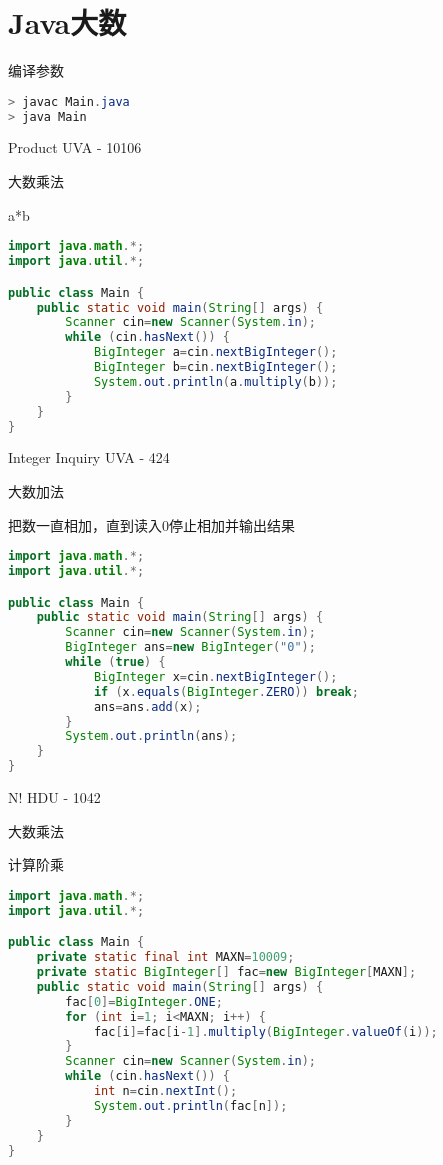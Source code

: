 \section{Java大数}

编译参数

\begin{lstlisting}[language={java}]
> javac Main.java
> java Main
\end{lstlisting}

Product UVA - 10106

大数乘法

a*b

\begin{lstlisting}[language={java}]
import java.math.*;
import java.util.*;

public class Main {
    public static void main(String[] args) {
        Scanner cin=new Scanner(System.in);
        while (cin.hasNext()) {
            BigInteger a=cin.nextBigInteger();
            BigInteger b=cin.nextBigInteger();
            System.out.println(a.multiply(b));
        }
    }
}
\end{lstlisting}

Integer Inquiry UVA - 424

大数加法

把数一直相加，直到读入0停止相加并输出结果

\begin{lstlisting}[language={java}]
import java.math.*;
import java.util.*;

public class Main {
    public static void main(String[] args) {
        Scanner cin=new Scanner(System.in);
        BigInteger ans=new BigInteger("0");
        while (true) {
            BigInteger x=cin.nextBigInteger();
            if (x.equals(BigInteger.ZERO)) break;
            ans=ans.add(x);
        }
        System.out.println(ans);
    }
}
\end{lstlisting}

N! HDU - 1042

大数乘法

计算阶乘

\begin{lstlisting}[language={java}]
import java.math.*;
import java.util.*;

public class Main {
    private static final int MAXN=10009;
    private static BigInteger[] fac=new BigInteger[MAXN];
    public static void main(String[] args) {
        fac[0]=BigInteger.ONE;
        for (int i=1; i<MAXN; i++) {
            fac[i]=fac[i-1].multiply(BigInteger.valueOf(i));
        }
        Scanner cin=new Scanner(System.in);
        while (cin.hasNext()) {
            int n=cin.nextInt();
            System.out.println(fac[n]);
        }
    }
}
\end{lstlisting}

